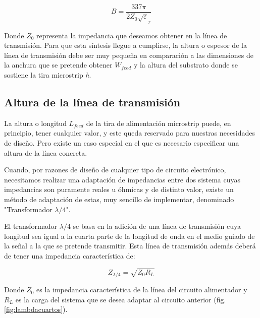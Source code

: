 \begin{equation}
	B=\frac{337\pi}{2Z_{0}\sqrt\varepsilon_{r}} 
	\label{eq:B}
\end{equation}

\par Donde $Z_{0}$ representa la impedancia que deseamos obtener en la línea de transmisión. Para que esta síntesis llegue a cumplirse, la altura o espesor de la línea de transmisión debe ser muy pequeña en comparación a las dimensiones de la anchura que se pretende obtener $W_{feed}$ y la altura del substrato donde se sostiene la tira microstrip \textit{h}.

\subsection{Altura de la línea de transmisión}
\par La altura o longitud $L_{feed}$ de la tira de alimentación microstrip puede, en principio, tener cualquier valor, y este queda reservado para nuestras necesidades de diseño. Pero existe un caso especial en el que es necesario especificar una altura de la línea concreta.
\\
\par Cuando, por razones de diseño de cualquier tipo de circuito electrónico, necesitamos realizar una adaptación de impedancias entre dos sistema cuyas impedancias son puramente reales u óhmicas y de distinto valor, existe un método de adaptación de estas, muy sencillo de implementar, denominado "Transformador $\lambda/4$". 
\\
\par El transformador $\lambda/4$ se basa en la adición de una línea de transmisión cuya longitud sea igual a la cuarta parte de la longitud de onda en el medio guiado de la señal a la que se pretende transmitir. Esta línea de transmisión además deberá de tener una impedancia característica de:

\begin{equation}
	Z_{\lambda /4}=\sqrt{Z_{0}R_{L}}
	\label{eq:lambdacuartos}
\end{equation}

\par Donde $Z_{0}$ es la impedancia característica de la línea del circuito alimentador y $R_{L}$ es la carga del sistema que se desea adaptar al circuito anterior (fig. \ref{fig:lambdacuartos}).

